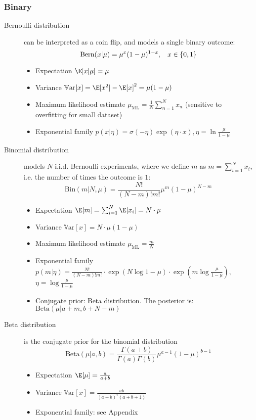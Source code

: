 \subsubsection{Binary}
\begin{description}
	\item[Bernoulli distribution] can be interpreted as a coin flip, and models a single binary outcome:
	$$\text{Bern}(x|\mu)=\mu^{x}(1-\mu)^{1-x}, \hspace{3mm}x\in\{0,1\}$$
	\begin{itemize}
		\item Expectation $\E[x|\mu]=\mu$
		\item Variance $\mathbb{V}\text{ar}[x]=\E[x^2]-\E[x]^2=\mu(1-\mu)$
		\item Maximum likelihood estimate $\mu_{\text{ML}}=\frac{1}{N}\sum_{n=1}^{N} x_n$ (sensitive to overfitting for small dataset)
		\item Exponential family $p(x|\eta)=\sigma(-\eta)\exp(\eta\cdot x), \eta=\ln \frac{\mu}{1-\mu}$
	\end{itemize}

	\item[Binomial distribution] models $N$ i.i.d. Bernoulli experiments, where we define $m$ as $m=\sum_{i=1}^{N}x_i$, i.e. the number of times the outcome is $1$:
	$$\text{Bin}(m|N,\mu)=\frac{N!}{(N-m)!m!}\mu^{m}(1 - \mu)^{N-m}$$	
	\begin{itemize}
		\item Expectation $\E[m]=\sum_{i=1}^{N}\E[x_i]=N\cdot \mu$
		\item Variance $\mathbb{V}\text{ar}[x]=N\cdot \mu(1-\mu)$
		\item Maximum likelihood estimate $\mu_{\text{ML}}=\frac{m}{N}$
		\item Exponential family $p(m|\eta)=\frac{N!}{(N-m)!m!}\cdot \exp(N \log 1-\mu) \cdot \exp(m\log\frac{\mu}{1-\mu})$, $\eta=\log \frac{\mu}{1-\mu}$
		\item Conjugate prior: Beta distribution. The posterior is: $\text{Beta}(\mu|a+m,b+N-m)$
	\end{itemize}

	\item[Beta distribution] is the conjugate prior for the binomial distribution
	$$\text{Beta}(\mu|a,b)=\frac{\Gamma(a+b)}{\Gamma(a)\Gamma(b)}\mu^{a-1}(1-\mu)^{b-1}$$
	\begin{itemize}
		\item Expectation $\E[\mu]=\frac{a}{a+b}$
		\item Variance $\mathbb{V}\text{ar}[x]=\frac{ab}{(a+b)^2(a+b+1)}$
		\item Exponential family: see Appendix
	\end{itemize}
\end{description}
